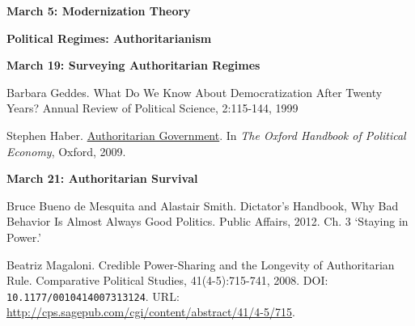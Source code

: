 \documentclass[letterpaper]{article}
\renewenvironment{itemize}{
  \begin{list}{}{
    \setlength{\leftmargin}{1.5em}
  }
}{
  \end{list}
}
\begin{document}
\begin{enumerate}
\begin{itemize} {\bf March 5: Modernization Theory}
	\end{itemize}







\item {\bf Political Regimes: Authoritarianism}
\begin{itemize}	
	\item {\bf March 19: Surveying Authoritarian Regimes}
			\begin{itemize}
				\item[$\bullet$] Barbara Geddes. What Do We Know About Democratization After Twenty Years? Annual Review of Political Science, 2:115-144, 1999
				\item[$\bullet$] Stephen Haber. \href{http://www.oxfordhandbooks.com/oxford/downloaddoclightbox/$002f10.1093$002foxfordhb$002f9780199548477.001.0001$002foxfordhb-9780199548477-e-038/Authoritarian$0020Government;jsessionid=2E89E3A5EE542CF1CE7583F64EFD4C17?nojs=true}{Authoritarian Government}. In \emph{The Oxford Handbook of Political Economy}, Oxford, 2009. 
			\end{itemize}


	\item {\bf March 21: Authoritarian Survival}
			\begin{itemize}
				\item[$\bullet$] Bruce Bueno de Mesquita and Alastair Smith. Dictator's Handbook, Why Bad Behavior Is Almost Always Good Politics. Public Affairs, 2012. Ch. 3 `Staying in Power.'
				\item[$\bullet$] Beatriz Magaloni. Credible Power-Sharing and the Longevity of Authoritarian Rule. Comparative Political Studies, 41(4-5):715-741, 2008. DOI: \texttt{10.1177/0010414007313124}. URL: \url{http://cps.sagepub.com/cgi/content/abstract/41/4-5/715}.
			\end{itemize}
\end{itemize}




\end{enumerate}
\end{document}
